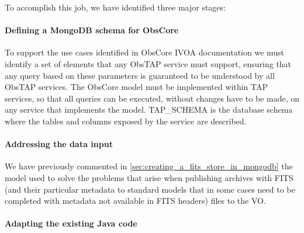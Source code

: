 To accomplish this job, we have identified three major stages:

\paragraph*{Defining a MongoDB schema for ObsCore}
\label{sec:mongodb_obscore}
To support the use cases identified in ObsCore IVOA documentation  we must identify a set of elements that any ObsTAP service must support, ensuring that any query based on these parameters is guaranteed to be understood by all ObsTAP services.
The ObsCore model must be implemented within TAP services, so that all queries can be executed, without changes have to be made, on any service that implements the model.
TAP\_SCHEMA is the database schema where the tables and columns exposed by the service are described.



\paragraph*{Addressing the data input}
\label{sec:data_input}
We have previously commented in \ref{sec:creating_a_fits_store_in_mongodb} the model used to solve the problems that arise when publishing archives with FITS (and their particular metadata to standard models that in some cases need to be completed with metadata not available in FITS headers) files to the VO.

\paragraph*{Adapting the existing Java code}
\label{sec:spring_mongo}